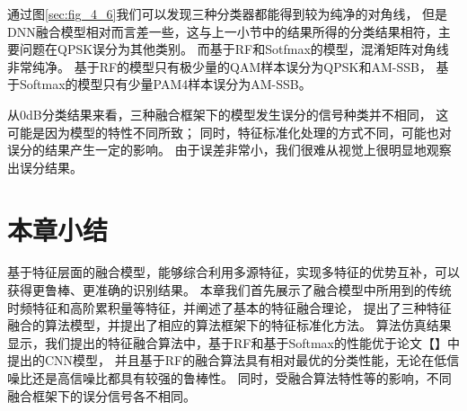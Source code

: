 通过图\ref{sec:fig_4_6}我们可以发现三种分类器都能得到较为纯净的对角线，
但是DNN融合模型相对而言差一些，这与上一小节中的结果所得的分类结果相符，主要问题在QPSK误分为其他类别。
而基于RF和Sotfmax的模型，混淆矩阵对角线非常纯净。
基于RF的模型只有极少量的QAM样本误分为QPSK和AM-SSB，
基于Softmax的模型只有少量PAM4样本误分为AM-SSB。\par

从0dB分类结果来看，三种融合框架下的模型发生误分的信号种类并不相同，
这可能是因为模型的特性不同所致；
同时，特征标准化处理的方式不同，可能也对误分的结果产生一定的影响。
由于误差非常小，我们很难从视觉上很明显地观察出误分结果。

\section{本章小结}
基于特征层面的融合模型，能够综合利用多源特征，实现多特征的优势互补，可以获得更鲁棒、更准确的识别结果。
本章我们首先展示了融合模型中所用到的传统时频特征和高阶累积量等特征，并阐述了基本的特征融合理论，
提出了三种特征融合的算法模型，并提出了相应的算法框架下的特征标准化方法。
算法仿真结果显示，我们提出的特征融合算法中，基于RF和基于Softmax的性能优于论文【】中提出的CNN模型，
并且基于RF的融合算法具有相对最优的分类性能，无论在低信噪比还是高信噪比都具有较强的鲁棒性。
同时，受融合算法特性等的影响，不同融合框架下的误分信号各不相同。
\par
